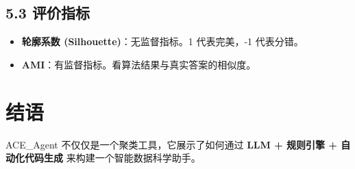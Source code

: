 \documentclass[11pt,a4paper]{article}
\begin{document}
\subsection{5.3 评价指标}
\begin{itemize}
    \item \textbf{轮廓系数 (Silhouette)}：无监督指标。1 代表完美，-1 代表分错。
    \item \textbf{AMI}：有监督指标。看算法结果与真实答案的相似度。
\end{itemize}

\section{结语}
ACE\_Agent 不仅仅是一个聚类工具，它展示了如何通过 \textbf{LLM + 规则引擎 + 自动化代码生成} 来构建一个智能数据科学助手。
\end{document}
